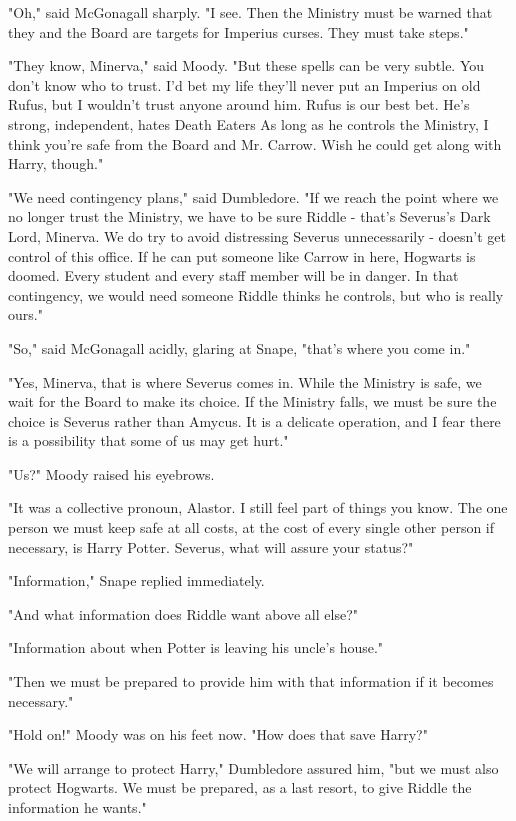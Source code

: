 "Oh," said McGonagall sharply. "I see. Then the Ministry must be warned that they and the Board are targets for Imperius curses. They must take steps."

"They know, Minerva," said Moody. "But these spells can be very subtle. You don't know who to trust. I'd bet my life they'll never put an Imperius on old Rufus, but I wouldn't trust anyone around him. Rufus is our best bet. He's strong, independent, hates Death Eaters{\el} As long as he controls the Ministry, I think you're safe from the Board and Mr. Carrow. Wish he could get along with Harry, though."

"We need contingency plans," said Dumbledore. "If we reach the point where we no longer trust the Ministry, we have to be sure Riddle - that's Severus's Dark Lord, Minerva. We do try to avoid distressing Severus unnecessarily - doesn't get control of this office. If he can put someone like Carrow in here, Hogwarts is doomed. Every student and every staff member will be in danger. In that contingency, we would need someone Riddle thinks he controls, but who is really ours."

"So," said McGonagall acidly, glaring at Snape, "that's where you come in."

"Yes, Minerva, that is where Severus comes in. While the Ministry is safe, we wait for the Board to make its choice. If the Ministry falls, we must be sure the choice is Severus rather than Amycus. It is a delicate operation, and I fear there is a possibility that some of us may get hurt."

"Us?" Moody raised his eyebrows.

"It was a collective pronoun, Alastor. I still feel part of things you know. The one person we must keep safe at all costs, at the cost of every single other person if necessary, is Harry Potter. Severus, what will assure your status?"

"Information," Snape replied immediately.

"And what information does Riddle want above all else?"

"Information about when Potter is leaving his uncle's house."

"Then we must be prepared to provide him with that information if it becomes necessary."

"Hold on!" Moody was on his feet now. "How does that save Harry?"

"We will arrange to protect Harry," Dumbledore assured him, "but we must also protect Hogwarts. We must be prepared, as a last resort, to give Riddle the information he wants."

